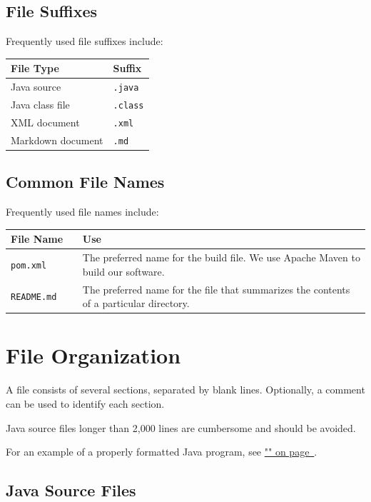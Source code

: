 \documentclass{article}
\begin{document}
\subsection{File Suffixes}

Frequently used file suffixes include:

\begin{tabular}{ll}
\hline
File Type & Suffix \\
\hline
Java source & \texttt{.java} \\
Java class file & \texttt{.class} \\
XML document & \texttt{.xml} \\
Markdown document & \texttt{.md} \\
\hline
\end{tabular}

\subsection{Common File Names}

Frequently used file names include:

\begin{tabular}{p{0.2\linewidth} >{\raggedright\arraybackslash}p{0.8\linewidth}}
\hline
File Name & Use \\
\hline
\texttt{pom.xml} & The preferred name for the build file. \newline We use Apache Maven to build our
  software. \\
\texttt{README.md} & The preferred name for the file that summarizes the contents of a particular
  directory. \\
\hline
\end{tabular}

\section{File Organization}

A file consists of several sections, separated by blank lines. Optionally, a comment can be used to
identify each section.

Java source files longer than 2,000 lines are cumbersome and should be avoided.

For an example of a properly formatted Java program, see
\hyperref[codeexample]{"" on page~\pageref*{codeexample}}.

\subsection{Java Source Files}
\end{document}
